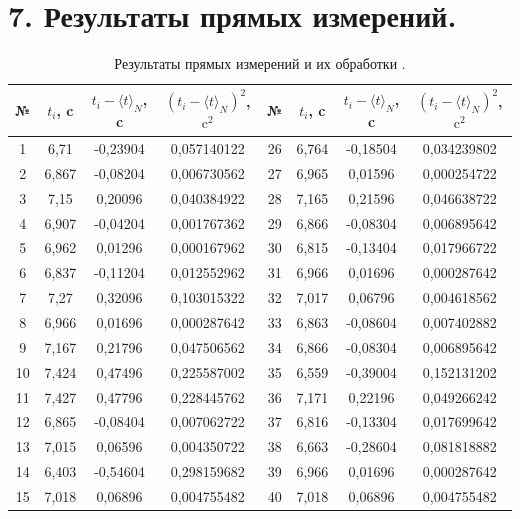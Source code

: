 \documentclass[14pt]{extreport}
\begin{document}
\section*{7. Результаты прямых измерений.}
\begin{table}[H]\label{t2}
\caption{Результаты прямых измерений и их обработки .}
\small
\centering
\begin{tabular}{|c|c|c|c|c|c|c|c|}
\hline
 № & $t_i$, c & $t_i - \langle t \rangle_N$, c & $(t_i - \langle t \rangle_N)^2$, $\mathrm{c}^2$ & № & $t_i$, c & $t_i - \langle t \rangle_N$, c & $(t_i - \langle t \rangle_N)^2$, $\mathrm{c}^2$ \\
 \hline
        1 & 6,71 & -0,23904 & 0,057140122  & 26 & 6,764 & -0,18504 & 0,034239802  \\ \hline
        2 & 6,867 & -0,08204 & 0,006730562  & 27 & 6,965 & 0,01596 & 0,000254722  \\ \hline
        3 & 7,15 & 0,20096 & 0,040384922  & 28 & 7,165 & 0,21596 & 0,046638722  \\ \hline
        4 & 6,907 & -0,04204 & 0,001767362  & 29 & 6,866 & -0,08304 & 0,006895642  \\ \hline
        5 & 6,962 & 0,01296 & 0,000167962  & 30 & 6,815 & -0,13404 & 0,017966722  \\ \hline
        6 & 6,837 & -0,11204 & 0,012552962  & 31 & 6,966 & 0,01696 & 0,000287642  \\ \hline
        7 & 7,27 & 0,32096 & 0,103015322  & 32 & 7,017 & 0,06796 & 0,004618562  \\ \hline
        8 & 6,966 & 0,01696 & 0,000287642  & 33 & 6,863 & -0,08604 & 0,007402882  \\ \hline
        9 & 7,167 & 0,21796 & 0,047506562  & 34 & 6,866 & -0,08304 & 0,006895642  \\ \hline
        10 & 7,424 & 0,47496 & 0,225587002  & 35 & 6,559 & -0,39004 & 0,152131202  \\ \hline
        11 & 7,427 & 0,47796 & 0,228445762  & 36 & 7,171 & 0,22196 & 0,049266242  \\ \hline
        12 & 6,865 & -0,08404 & 0,007062722  & 37 & 6,816 & -0,13304 & 0,017699642  \\ \hline
        13 & 7,015 & 0,06596 & 0,004350722  & 38 & 6,663 & -0,28604 & 0,081818882  \\ \hline
        14 & 6,403 & -0,54604 & 0,298159682  & 39 & 6,966 & 0,01696 & 0,000287642  \\ \hline
        15 & 7,018 & 0,06896 & 0,004755482  & 40 & 7,018 & 0,06896 & 0,004755482  \\ \hline

\end{tabular}
\end{table}
\end{document}
